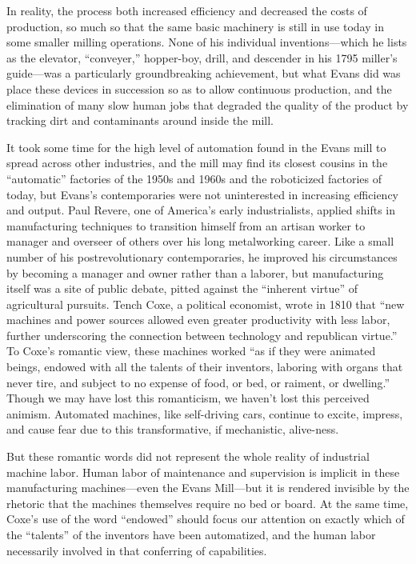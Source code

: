 In reality, the process both increased efficiency and decreased the costs
of production, so much so that the same basic machinery is still in
use today in some smaller milling operations.\cite{wyegrist} None of his individual
inventions---which he lists as the elevator, ``conveyer,'' hopper-boy,
drill, and descender in his 1795 miller's guide---was a particularly
groundbreaking achievement, but what Evans did was place these devices
in succession so as to allow continuous production, and the
elimination of many slow human jobs that degraded the quality of the
product by tracking dirt and contaminants around inside the
mill.\cite[p. 203]{evansMillguide} 

It took some time for the high level of automation found in the Evans
mill to spread across other industries, and the mill may find its
closest cousins in the ``automatic'' factories of the 1950s and 1960s
and the roboticized factories of today, but Evans's contemporaries
were not uninterested in increasing efficiency and output. Paul
Revere, one of America's early industrialists, applied shifts in
manufacturing techniques to transition himself from an
artisan worker to manager and overseer of others over his long
metalworking career.\cite[p. 187]{martello} Like a small number of his postrevolutionary
contemporaries, he improved his circumstances by becoming a manager
and owner rather than a laborer, but manufacturing itself was a site of public
debate, pitted against the ``inherent virtue'' of agricultural pursuits.
Tench Coxe, a political economist, wrote in 1810 that ``new machines
and power sources allowed even greater productivity with less labor,
further underscoring the connection between technology and republican
virtue.''\cite[p. 217]{martello} To Coxe's romantic view, these machines  worked ``as if they
were animated beings, endowed with all the talents of their inventors,
laboring with organs that never tire, and subject to no expense of
food, or bed, or raiment, or dwelling.''\cite[p. xxv]{coxe} Though we
may have lost this romanticism, we haven't lost this perceived
animism. Automated machines, like self-driving cars, continue to
excite, impress, and cause fear due to this transformative, if
mechanistic, alive-ness.

But these romantic words did not represent the whole reality of
industrial machine labor. Human labor of
maintenance and supervision is implicit in these manufacturing
machines---even the Evans Mill---but it is rendered invisible by the rhetoric that the
machines themselves require no bed or board. At the same time, Coxe's
use of the word ``endowed'' should focus our attention on exactly which
of the ``talents'' of the inventors have been automatized, and the human
labor necessarily involved in that conferring of capabilities. 

